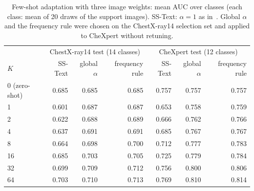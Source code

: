 \begin{table}[!t]
\centering
\footnotesize
\caption{Few-shot adaptation with three image weights: mean AUC over classes (each class: mean of 20 draws of the
support images). SS-Text: $\alpha=1$ as in~\cite{silvarodriguez2025fca}. Global $\alpha$ and the frequency rule
were chosen on the ChestX-ray14 selection set and applied to CheXpert without retuning.}
\label{tab:weight}
\begin{tabular}{lrrrrrr}
\toprule
 & \multicolumn{3}{c}{ChestX-ray14 test (14 classes)} & \multicolumn{3}{c}{CheXpert test (12 classes)} \\
$K$ & SS-Text & global $\alpha$ & frequency rule & SS-Text & global $\alpha$ & frequency rule \\
\midrule
0 (zero-shot) & 0.685 & 0.685 & 0.685 & 0.757 & 0.757 & 0.757 \\
1 & 0.601 & 0.687 & 0.687 & 0.653 & 0.758 & 0.759 \\
2 & 0.622 & 0.688 & 0.689 & 0.666 & 0.762 & 0.766 \\
4 & 0.637 & 0.691 & 0.691 & 0.685 & 0.767 & 0.767 \\
8 & 0.664 & 0.698 & 0.700 & 0.712 & 0.777 & 0.783 \\
16 & 0.685 & 0.703 & 0.705 & 0.725 & 0.779 & 0.784 \\
32 & 0.699 & 0.709 & 0.712 & 0.756 & 0.800 & 0.806 \\
64 & 0.703 & 0.710 & 0.713 & 0.769 & 0.810 & 0.814 \\
\bottomrule
\end{tabular}
\end{table}
